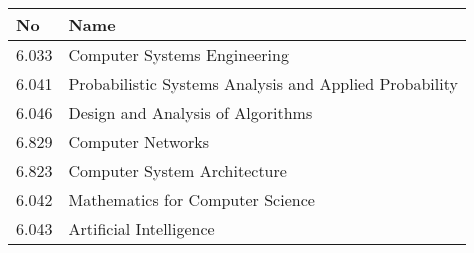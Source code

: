 \documentclass{book}
\begin{document}
\begin{tabular}{|l|l|}
\hline
No & Name \\ \hline \hline
6.033 & Computer Systems Engineering \\ \hline
6.041 &  Probabilistic Systems Analysis and Applied Probability \\ \hline
6.046 &  Design and Analysis of Algorithms \\ \hline
6.829 & Computer Networks \\ \hline
6.823 & Computer System Architecture \\ \hline
6.042 &  Mathematics for Computer Science \\ \hline
6.043 &  Artificial Intelligence \\ \hline
\end{tabular}
\end{document}
